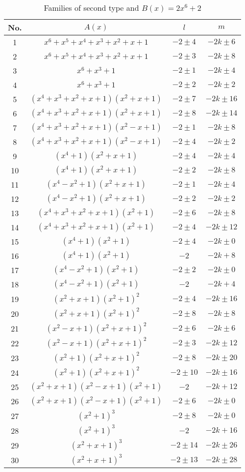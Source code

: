 \documentclass{amsart}
\begin{document}
\begin{table}[ht]
\caption{Families of second type and $B(x)=2x^6+2$}
\centering
\begin{tabular}{|c |c |c |c |}
\hline
No. & $A(x)$ & $l$ & $m$\\
\hline
1 & $x^6+x^5+x^4+x^3+x^2+x+1$ & $-2\pm4$ & $-2k\pm6$  \\
2 & $x^6+x^5+x^4+x^3+x^2+x+1$ & $-2\pm3$ & $-2k\pm8$  \\
3 & $x^6+x^3+1$ & $-2\pm1$ & $-2k\pm4$  \\
4 & $x^6+x^3+1$ & $-2\pm2$ & $-2k\pm2$  \\
5 & $(x^4+x^3+x^2+x+1)(x^2+x+1)$ & $-2\pm7$ & $-2k\pm16$  \\
6 & $(x^4+x^3+x^2+x+1)(x^2+x+1)$ & $-2\pm8$ & $-2k\pm14$  \\
7 & $(x^4+x^3+x^2+x+1)(x^2-x+1)$ & $-2\pm1$ & $-2k\pm8$  \\
8 & $(x^4+x^3+x^2+x+1)(x^2-x+1)$ & $-2\pm4$ & $-2k\pm2$  \\
9 & $(x^4+1)(x^2+x+1)$ & $-2\pm4$ & $-2k\pm4$  \\
10 & $(x^4+1)(x^2+x+1)$ & $-2\pm2$ & $-2k\pm8$  \\
11 & $(x^4-x^2+1)(x^2+x+1)$ & $-2\pm1$ & $-2k\pm4$  \\
12 & $(x^4-x^2+1)(x^2+x+1)$ & $-2\pm2$ & $-2k\pm2$  \\
13 & $(x^4+x^3+x^2+x+1)(x^2+1)$ & $-2\pm6$ & $-2k\pm8$  \\
14 & $(x^4+x^3+x^2+x+1)(x^2+1)$ & $-2\pm4$ & $-2k\pm12$  \\
15 & $(x^4+1)(x^2+1)$ & $-2\pm4$ & $-2k\pm0$  \\
16 & $(x^4+1)(x^2+1)$ & $-2$ & $-2k+8$  \\
17 & $(x^4-x^2+1)(x^2+1)$ & $-2\pm2$ & $-2k\pm0$  \\
18 & $(x^4-x^2+1)(x^2+1)$ & $-2$ & $-2k+4$  \\
19 & $(x^2+x+1)(x^2+1)^2$ & $-2\pm4$ & $-2k\pm16$  \\
20 & $(x^2+x+1)(x^2+1)^2$ & $-2\pm8$ & $-2k\pm8$  \\
21 & $(x^2-x+1)(x^2+x+1)^2$ & $-2\pm6$ & $-2k\pm6$  \\
22 & $(x^2-x+1)(x^2+x+1)^2$ & $-2\pm3$ & $-2k\pm12$  \\
23 & $(x^2+1)(x^2+x+1)^2$ & $-2\pm8$ & $-2k\pm20$  \\
24 & $(x^2+1)(x^2+x+1)^2$ & $-2\pm10$ & $-2k\pm16$  \\
25 & $ (x^2+x+1)(x^2-x+1)(x^2+1)$ & $-2$ & $-2k+12$  \\
26 & $ (x^2+x+1)(x^2-x+1)(x^2+1)$ & $-2\pm6$ & $-2k\pm0$  \\
27 & $(x^2+1)^3$ & $-2\pm8$ & $-2k\pm0$  \\
28 & $(x^2+1)^3$ & $-2$ & $-2k+16$  \\
29 & $(x^2+x+1)^3$ & $-2\pm14$ & $-2k\pm26$ \\
30 & $(x^2+x+1)^3$ & $-2\pm13$ & $-2k\pm28$ \\
\hline
\end{tabular}
\end{table}
\end{document}

